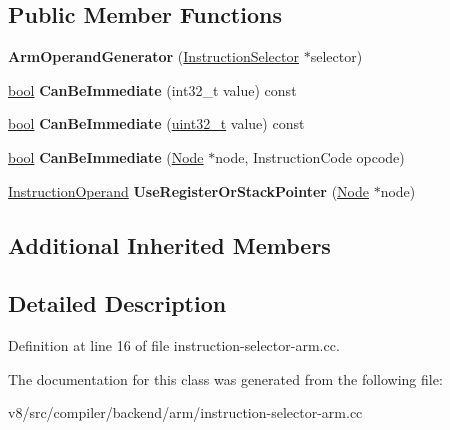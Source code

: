 \subsection*{Public Member Functions}
\begin{DoxyCompactItemize}
\item 
\mbox{\label{classv8_1_1internal_1_1compiler_1_1ArmOperandGenerator_a5844390d4f360a0dde8fb866f7a65b6e}} 
{\bfseries Arm\+Operand\+Generator} (\mbox{\hyperlink{classv8_1_1internal_1_1compiler_1_1InstructionSelector}{Instruction\+Selector}} $\ast$selector)
\item 
\mbox{\label{classv8_1_1internal_1_1compiler_1_1ArmOperandGenerator_afdcf58b6612033bf9999ac01a4523b91}} 
\mbox{\hyperlink{classbool}{bool}} {\bfseries Can\+Be\+Immediate} (int32\+\_\+t value) const
\item 
\mbox{\label{classv8_1_1internal_1_1compiler_1_1ArmOperandGenerator_afd8685c6b478405984de662e91639802}} 
\mbox{\hyperlink{classbool}{bool}} {\bfseries Can\+Be\+Immediate} (\mbox{\hyperlink{classuint32__t}{uint32\+\_\+t}} value) const
\item 
\mbox{\label{classv8_1_1internal_1_1compiler_1_1ArmOperandGenerator_a92b56593f00f3ff06025e2438dc9747f}} 
\mbox{\hyperlink{classbool}{bool}} {\bfseries Can\+Be\+Immediate} (\mbox{\hyperlink{classv8_1_1internal_1_1compiler_1_1Node}{Node}} $\ast$node, Instruction\+Code opcode)
\item 
\mbox{\label{classv8_1_1internal_1_1compiler_1_1ArmOperandGenerator_a617aaed6d0f96d09c3dee0e7f06abafe}} 
\mbox{\hyperlink{classv8_1_1internal_1_1compiler_1_1InstructionOperand}{Instruction\+Operand}} {\bfseries Use\+Register\+Or\+Stack\+Pointer} (\mbox{\hyperlink{classv8_1_1internal_1_1compiler_1_1Node}{Node}} $\ast$node)
\end{DoxyCompactItemize}
\subsection*{Additional Inherited Members}


\subsection{Detailed Description}


Definition at line 16 of file instruction-\/selector-\/arm.\+cc.



The documentation for this class was generated from the following file\+:\begin{DoxyCompactItemize}
\item 
v8/src/compiler/backend/arm/instruction-\/selector-\/arm.\+cc\end{DoxyCompactItemize}
